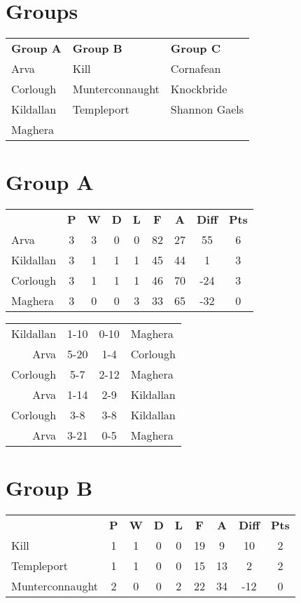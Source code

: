 \documentclass[11pt,a4paper]{article}
\begin{document}
\section*{Groups}

\begin{tabular}{lll}
\textbf{Group A} & \textbf{Group B} & \textbf{Group C} \\
Arva & Kill & Cornafean \\
Corlough & Munterconnaught & Knockbride \\
Kildallan & Templeport & Shannon Gaels \\
Maghera & & \\
\end{tabular}

\section*{Group A}

\begin{tabular}{lcccccccc}
 & \textbf{P} & \textbf{W} & \textbf{D} & \textbf{L} & \textbf{F} & \textbf{A} & \textbf{Diff} & \textbf{Pts} \\
Arva & 3 & 3 & 0 & 0 & 82 & 27 & 55 & 6 \\
Kildallan & 3 & 1 & 1 & 1 & 45 & 44 & 1 & 3 \\
Corlough & 3 & 1 & 1 & 1 & 46 & 70 & -24 & 3 \\
Maghera & 3 & 0 & 0 & 3 & 33 & 65 & -32 & 0\\
\end{tabular}

\vspace{10 mm}

\begin{tabular}{rccl}
Kildallan & 1-10 & 0-10 & Maghera \\
Arva & 5-20 & 1-4 & Corlough \\
Corlough & 5-7 & 2-12 & Maghera \\
Arva & 1-14 & 2-9 & Kildallan \\
Corlough & 3-8 & 3-8 & Kildallan \\
Arva & 3-21 & 0-5 & Maghera
\end{tabular}

\section*{Group B}

\begin{tabular}{lcccccccc}
 & \textbf{P} & \textbf{W} & \textbf{D} & \textbf{L} & \textbf{F} & \textbf{A} & \textbf{Diff} & \textbf{Pts} \\
Kill & 1 & 1 & 0 & 0 & 19 & 9 & 10 & 2 \\
Templeport & 1 & 1 & 0 & 0 & 15 & 13 & 2 & 2 \\
Munterconnaught & 2 & 0 & 0 & 2 & 22 & 34 & -12 & 0 \\
\end{tabular}
\end{document}
